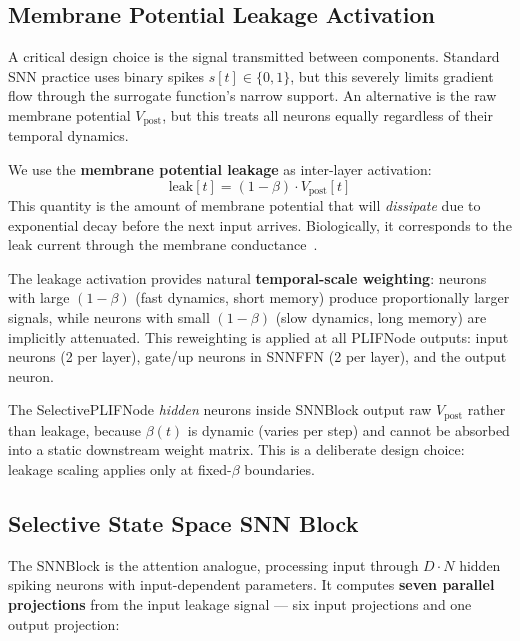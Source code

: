 \documentclass{article}
\newcommand{\vpost}{V_{\text{post}}}
\begin{document}
\subsection{Membrane Potential Leakage Activation}
\label{sec:leakage}

A critical design choice is the signal transmitted between components.
Standard SNN practice uses binary spikes $s[t] \in \{0,1\}$, but this severely limits gradient flow through the surrogate function's narrow support.
An alternative is the raw membrane potential $\vpost$, but this treats all neurons equally regardless of their temporal dynamics.

We use the \textbf{membrane potential leakage} as inter-layer activation:
\begin{equation}
    \text{leak}[t] = (1 - \beta) \cdot \vpost[t]
    \label{eq:leakage}
\end{equation}
This quantity is the amount of membrane potential that will \emph{dissipate} due to exponential decay before the next input arrives.
Biologically, it corresponds to the leak current through the membrane conductance~\citep{hodgkin1952quantitative, abbott1999lapicque}.

The leakage activation provides natural \textbf{temporal-scale weighting}:
neurons with large $(1-\beta)$ (fast dynamics, short memory) produce proportionally larger signals,
while neurons with small $(1-\beta)$ (slow dynamics, long memory) are implicitly attenuated.
This reweighting is applied at all PLIFNode outputs: input neurons (2 per layer), gate/up neurons in SNNFFN (2 per layer), and the output neuron.

The SelectivePLIFNode \emph{hidden} neurons inside SNNBlock output raw $\vpost$ rather than leakage, because $\beta(t)$ is dynamic (varies per step) and cannot be absorbed into a static downstream weight matrix.
This is a deliberate design choice: leakage scaling applies only at fixed-$\beta$ boundaries.

\subsection{Selective State Space SNN Block}
\label{sec:snn-block}

The SNNBlock is the attention analogue, processing input through $D \cdot N$ hidden spiking neurons with input-dependent parameters.
It computes \textbf{seven parallel projections} from the input leakage signal --- six input projections and one output projection:
\end{document}
